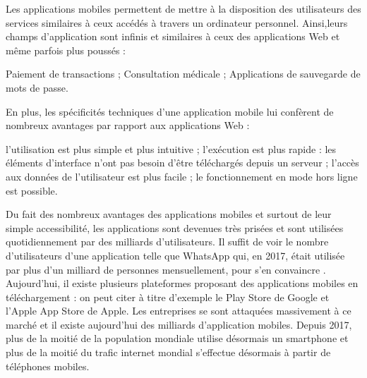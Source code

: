\begin{comment}
Il existe principalement trois types d'applications mobiles :\\
- Native : applications mobiles spécifiques systèmes d'exploitation mobile Ios, Android ou Windows Phone;\\
- Hybride : applications mobiles disponibles à la fois pour toutes les plateformes;\\
- Web : Version responsive\footnote{Le Responsive Web Design (RWD), ou conception web adaptative, regroupe une série de techniques de conception graphique et de développement permettant de créer un site qui pourra s'auto-adapter en fonction de la taille d'un écran.} utilisant des navigateurs web embarqués.\\
\end{comment}
Les applications mobiles permettent de mettre à la disposition des utilisateurs des services similaires à ceux accédés à travers un ordinateur personnel. Ainsi,leurs champs d'application sont infinis et similaires à ceux des applications Web et même parfois plus poussés :
\begin{itemize}
	\itemtirait Paiement de transactions ;
	\itemtirait Consultation médicale ;
	\itemtirait Applications de sauvegarde de mots de passe.
\end{itemize}
En plus, les spécificités techniques d’une application mobile lui confèrent de nombreux avantages par rapport aux applications Web :
\begin{itemize}
	\itemcheck l'utilisation est plus simple et plus intuitive ;
	\itemcheck l’exécution est plus rapide : les éléments d’interface n’ont pas besoin d’être téléchargés depuis un serveur ;
	\itemcheck l’accès aux données de l’utilisateur est plus facile ; 
	\itemcheck le fonctionnement en mode hors ligne est possible.
\end{itemize}
Du fait des nombreux avantages des applications mobiles et surtout de leur simple accessibilité, les applications sont devenues très prisées et sont utilisées quotidiennement par des milliards d'utilisateurs. Il suffit de voir le nombre d'utilisateurs d'une application telle que WhatsApp qui, en 2017, était utilisée par plus d'un milliard de personnes mensuellement, pour s'en convaincre \cite{whatsapp-usage}. Aujourd'hui, il existe plusieurs plateformes proposant des applications mobiles en téléchargement : on peut citer à titre d'exemple le Play Store de Google et l'Apple App Store de Apple. Les entreprises se sont attaquées massivement à ce marché et il existe aujourd'hui des milliards d'application mobiles. Depuis 2017, plus de la moitié de la population mondiale utilise désormais un smartphone et plus de la moitié du trafic internet mondial s’effectue désormais à partir de téléphones mobiles.\cite{consumer-barometer}\\

